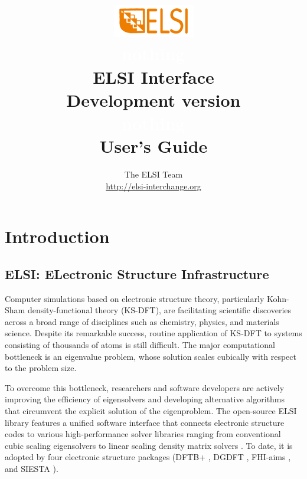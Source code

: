 \documentclass{report}
\newcommand{\tcw}[1]{\textcolor{white}{#1}}
\begin{document}
\title{\includegraphics[scale=0.07]{elsi_logo.png}\\ \tcw{nothing}\\ \textbf{ELSI Interface\\ Development version\\ \tcw{nothing}\\ User's Guide}}
\author{The ELSI Team\\ \url{http://elsi-interchange.org}}
\maketitle

\tableofcontents

\chapter{Introduction}
\section{ELSI: ELectronic Structure Infrastructure}
\label{sec:elsi}
Computer simulations based on electronic structure theory, particularly Kohn-Sham density-functional theory (KS-DFT), are facilitating scientific discoveries across a broad range of disciplines such as chemistry, physics, and materials science. Despite its remarkable success, routine application of KS-DFT to systems consisting of thousands of atoms is still difficult. The major computational bottleneck is an eigenvalue problem, whose solution scales cubically with respect to the problem size.

To overcome this bottleneck, researchers and software developers are actively improving the efficiency of eigensolvers and developing alternative algorithms that circumvent the explicit solution of the eigenproblem. The open-source ELSI library features a unified software interface that connects electronic structure codes to various high-performance solver libraries ranging from conventional cubic scaling eigensolvers to linear scaling density matrix solvers \cite{elsi_yu_2018}. To date, it is adopted by four electronic structure packages (DFTB+ \cite{dftb_aradi_2007}, DGDFT \cite{dgdft_hu_2015}, FHI-aims \cite{fhiaims_blum_2009}, and SIESTA \cite{siesta_soler_2002}).
\end{document}
